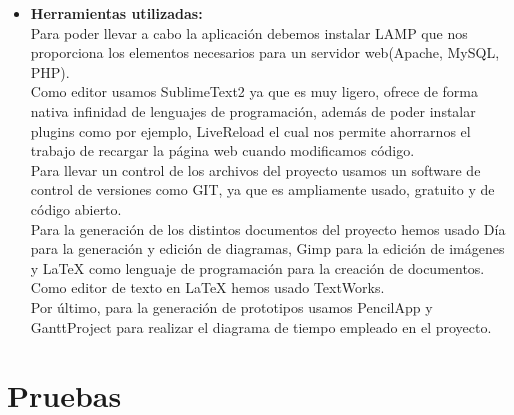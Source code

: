 \documentclass[a4paper,12pt]{article}
\begin{document}
\begin{itemize}
\item \textbf{Herramientas utilizadas:}\\
Para poder llevar a cabo la aplicación debemos instalar LAMP que nos proporciona los elementos necesarios para un servidor web(Apache, MySQL, PHP).\\
Como editor usamos SublimeText2 ya que es muy ligero, ofrece de forma nativa infinidad de lenguajes de programación, además de poder instalar plugins como por ejemplo, LiveReload el cual nos permite ahorrarnos el trabajo de recargar la página web cuando modificamos código.\\
Para llevar un control de los archivos del proyecto usamos un software de control de versiones como GIT, ya que es ampliamente usado, gratuito y de código abierto.\\
Para la generación de los distintos documentos del proyecto hemos usado Día para la generación y edición de diagramas, Gimp para la edición de imágenes y \LaTeX{} como lenguaje de programación para la creación de documentos. Como editor de texto en \LaTeX{} hemos usado TextWorks.\\
Por último, para la generación de prototipos usamos PencilApp y GanttProject para realizar el diagrama de tiempo empleado en el proyecto.

\end{itemize}

\section{\fontsize{12}{1}\selectfont Pruebas}
\end{document}
